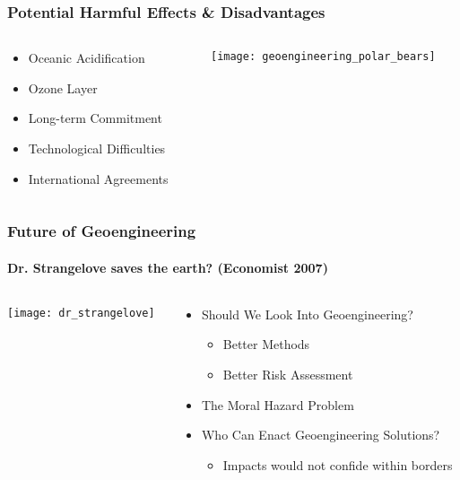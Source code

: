 \documentclass{beamer}
\begin{document}
\begin{frame}
\frametitle{Potential Harmful Effects \& Disadvantages}
	\begin{columns}
	\begin{column}{5.5cm}
		\begin{itemize}
				\item Oceanic Acidification
		\vspace{0.8cm} 
				\item Ozone Layer
		\vspace{0.8cm} 
				\item Long-term Commitment 
		\vspace{0.8cm}  
				\item Technological Difficulties
		\vspace{0.8cm} 
				\item International Agreements
			\end{itemize}
	\end{column}
	\begin{column}{5.5cm}
		\texttt{[image: geoengineering\_polar\_bears]}
	\end{column}
	\end{columns}
\end{frame}

\begin{frame}
\frametitle{Future of Geoengineering}
\framesubtitle{Dr. Strangelove saves the earth? (Economist 2007)}
\begin{columns}
\begin{column}{6.75cm}
	\texttt{[image: dr\_strangelove]}
\end{column}
\begin{column}{5.75cm}
\begin{itemize}
	\item Should We Look Into Geoengineering?
		\begin{itemize}
			\item Better Methods
			\item Better Risk Assessment
		\end{itemize}
	\vspace{0.3cm}
	\item The Moral Hazard Problem
	\vspace{0.3cm}
	\item Who Can Enact Geoengineering Solutions?
	\begin{itemize}
		\item Impacts would not confide within borders
	\end{itemize}
\end{itemize}
\end{column}
\end{columns}
\end{frame}
\end{document}
